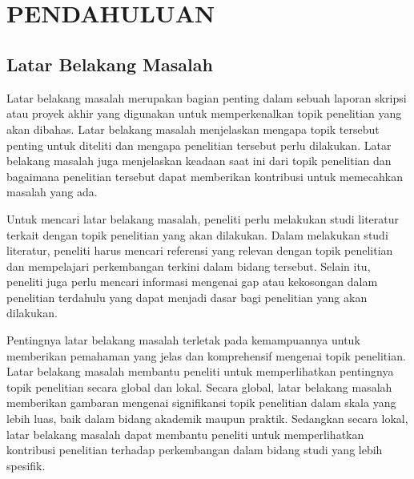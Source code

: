 
\chapter[PENDAHULUAN]{\\ PENDAHULUAN}

\section{Latar Belakang Masalah}
Latar belakang masalah merupakan bagian penting dalam sebuah laporan skripsi atau proyek akhir yang digunakan untuk memperkenalkan topik penelitian yang akan dibahas. Latar belakang masalah menjelaskan mengapa topik tersebut penting untuk diteliti dan mengapa penelitian tersebut perlu dilakukan. Latar belakang masalah juga menjelaskan keadaan saat ini dari topik penelitian dan bagaimana penelitian tersebut dapat memberikan kontribusi untuk memecahkan masalah yang ada.

Untuk mencari latar belakang masalah, peneliti perlu melakukan studi literatur terkait dengan topik penelitian yang akan dilakukan. Dalam melakukan studi literatur, peneliti harus mencari referensi yang relevan dengan topik penelitian dan mempelajari perkembangan terkini dalam bidang tersebut. Selain itu, peneliti juga perlu mencari informasi mengenai gap atau kekosongan dalam penelitian terdahulu yang dapat menjadi dasar bagi penelitian yang akan dilakukan.

Pentingnya latar belakang masalah terletak pada kemampuannya untuk memberikan pemahaman yang jelas dan komprehensif mengenai topik penelitian. Latar belakang masalah membantu peneliti untuk memperlihatkan pentingnya topik penelitian secara global dan lokal. Secara global, latar belakang masalah memberikan gambaran mengenai signifikansi topik penelitian dalam skala yang lebih luas, baik dalam bidang akademik maupun praktik. Sedangkan secara lokal, latar belakang masalah dapat membantu peneliti untuk memperlihatkan kontribusi penelitian terhadap perkembangan dalam bidang studi yang lebih spesifik.

